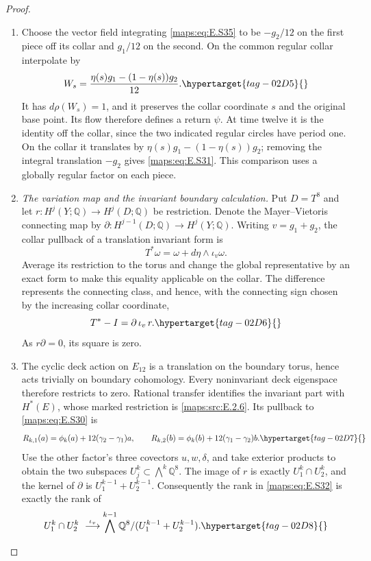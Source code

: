 \documentclass[11pt,a4paper]{article}
\numberwithin{equation}{section}
\theoremstyle{definition}
\begin{document}
\begin{proof}
\begin{enumerate}[label=\arabic*.,leftmargin=*]
\item Choose the vector field integrating \eqref{maps:eq:E.S35} to be
$-g_2/12$ on the first piece off its collar and $g_1/12$
on the second. On the common regular collar interpolate by
\begin{equation}
                     W_s=\frac{\eta(s)g_1-(1-\eta(s))g_2}{12}.
 \hypertarget{tag-02D5}{}\label{maps:eq:E.S36}
\end{equation}
It has $d\rho(W_s)=1$, and it preserves the collar
coordinate $s$ and the original base point. Its flow
therefore defines a return $\psi$. At time twelve it is
the identity off the collar, since the two indicated
regular circles have period one. On the collar it
translates by $\eta(s)g_1-(1-\eta(s))g_2$; removing the
integral translation $-g_2$ gives \eqref{maps:eq:E.S31}. This comparison uses a globally regular factor on each piece.

\item \emph{The variation map and the invariant boundary calculation.}
Put $D=T^8$ and let $r:H^j(Y;\mathbb Q)\to H^j(D;\mathbb Q)$
be restriction. Denote the Mayer--Vietoris connecting map
by $\partial:H^{j-1}(D;\mathbb Q)\to H^j(Y;\mathbb Q)$.
Writing $v=g_1+g_2$, the collar pullback of a translation
invariant form is
\[
       T^*\omega=\omega+d\eta\wedge\iota_v\omega.
\]
Average its restriction to the torus and change the global
representative by an exact form to make this equality
applicable on the collar. The difference represents the
connecting class, and hence, with the connecting sign
chosen by the increasing collar coordinate,
\begin{equation}
                          T^*-I=\partial\,\iota_v\,r.
 \hypertarget{tag-02D6}{}\label{maps:eq:E.S37}
\end{equation}
As $r\partial=0$, its square is zero.

\item The cyclic deck action on $E_{12}$ is a translation on the
boundary torus, hence acts trivially on boundary cohomology.
Every noninvariant deck eigenspace therefore restricts to
zero. Rational transfer identifies the invariant part
with $H^*(E)$, whose marked restriction is \ref{maps:src:E.2.6}. Its
pullback to \eqref{maps:eq:E.S30} is
\begin{equation}
 R_{k,1}(a)=\phi_k(a)+12(\gamma_2-\gamma_1)a,
 \qquad
 R_{k,2}(b)=\phi_k(b)+12(\gamma_1-\gamma_2)b.
 \hypertarget{tag-02D7}{}\label{maps:eq:E.S38}
\end{equation}
Use the other factor's three covectors $u,w,\delta$,
and take exterior products to obtain the two subspaces
$U_j^k\subset\bigwedge^k\mathbb Q^8$.
The image of $r$ is exactly $U_1^k\cap U_2^k$, and the
kernel of $\partial$ is $U_1^{k-1}+U_2^{k-1}$.
Consequently the rank in \eqref{maps:eq:E.S32} is exactly the rank of
\begin{equation}
 U_1^k\cap U_2^k\ \stackrel{\iota_v}{\longrightarrow}
 \bigwedge^{k-1}\mathbb Q^8/(U_1^{k-1}+U_2^{k-1}).
 \hypertarget{tag-02D8}{}\label{maps:eq:E.S39}
\end{equation}


\end{enumerate}
\end{proof}
\end{document}
